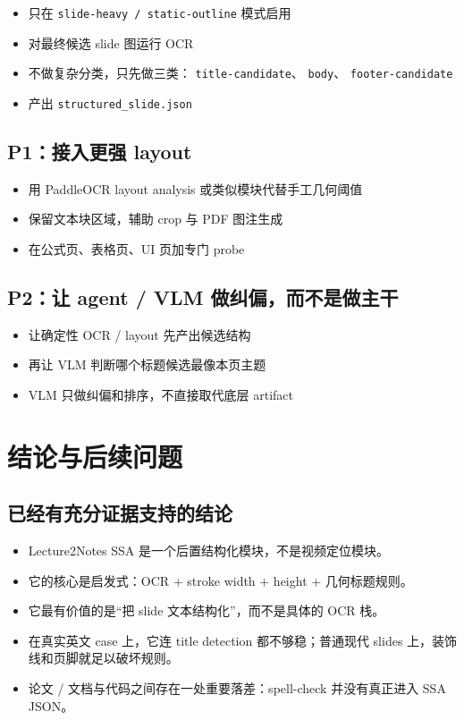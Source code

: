 \documentclass[a4paper]{article}
\begin{document}
\begin{itemize}
\item 只在 \texttt{slide-heavy / static-outline} 模式启用
\item 对最终候选 slide 图运行 OCR
\item 不做复杂分类，只先做三类：
  \texttt{title-candidate}、
  \texttt{body}、
  \texttt{footer-candidate}
\item 产出 \texttt{structured\_slide.json}
\end{itemize}

\subsection{P1：接入更强 layout}

\begin{itemize}
\item 用 PaddleOCR layout analysis 或类似模块代替手工几何阈值
\item 保留文本块区域，辅助 crop 与 PDF 图注生成
\item 在公式页、表格页、UI 页加专门 probe
\end{itemize}

\subsection{P2：让 agent / VLM 做纠偏，而不是做主干}

\begin{itemize}
\item 让确定性 OCR / layout 先产出候选结构
\item 再让 VLM 判断哪个标题候选最像本页主题
\item VLM 只做纠偏和排序，不直接取代底层 artifact
\end{itemize}

\section{结论与后续问题}

\subsection{已经有充分证据支持的结论}

\begin{itemize}
\item Lecture2Notes SSA 是一个后置结构化模块，不是视频定位模块。
\item 它的核心是启发式：OCR + stroke width + height + 几何标题规则。
\item 它最有价值的是“把 slide 文本结构化”，而不是具体的 OCR 栈。
\item 在真实英文 case 上，它连 title detection 都不够稳；普通现代 slides 上，装饰线和页脚就足以破坏规则。
\item 论文 / 文档与代码之间存在一处重要落差：spell-check 并没有真正进入 SSA JSON。
\end{itemize}
\end{document}
